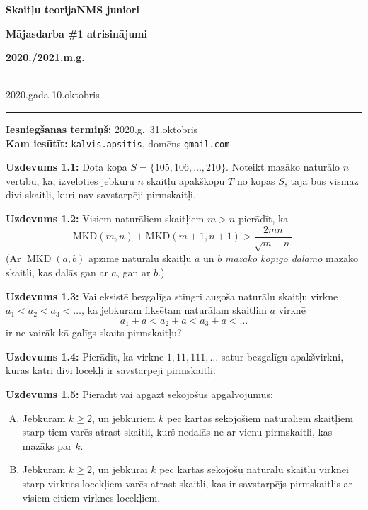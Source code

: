 \documentclass[a4paper,12pt]{article}
\begin{document}
\begin{center}
\parbox{3.5cm}{\flushleft\bf Skaitļu teorija\linebreak NMS juniori} \hfill {\bf \large Mājasdarba \#1 atrisinājumi} \hfill \parbox{3.5cm}{\flushright\bf 2020./2021.m.g.} \\[2pt]
\rm\small 2020.gada 10.oktobris
\end{center}

\hrule

\vspace{20pt}
{\bf Iesniegšanas termiņš:} 2020.g.\ 31.oktobris\\
{\bf Kam iesūtīt:} {\tt kalvis.apsitis}, domēns {\tt gmail.com}


\vspace{20pt}
{\bf Uzdevums 1.1:} 
Dota kopa $S = \{ 105,106,\ldots,210 \}$. Noteikt mazāko
naturālo $n$ vērtību, ka, izvēloties jebkuru $n$ skaitļu
apakškopu $T$ no kopas $S$, tajā būs vismaz divi skaitļi, kuri nav
savstarpēji pirmskaitļi.


\vspace{20pt}
{\bf Uzdevums 1.2:}
Visiem naturāliem skaitļiem $m > n$ pierādīt, ka
$$\mbox{MKD}(m,n) + \mbox{MKD}(m+1,n+1) > \frac{2mn}{\sqrt{m-n}}.$$
(Ar $\operatorname{MKD}(a,b)$ apzīmē naturālu skaitļu $a$ un $b$ {\em mazāko 
kopīgo dalāmo} \textendash{} mazāko skaitli, kas dalās gan ar $a$, gan ar $b$.)


\vspace{20pt}
{\bf Uzdevums 1.3:}
Vai eksistē bezgalīga
stingri augoša naturālu skaitļu virkne $a_1 < a_2 < a_3 <\ldots$,
ka jebkuram fiksētam naturālam skaitlim $a$ virknē 
$$a_1+a < a_2+a < a_3 + a < \ldots$$
ir ne vairāk kā galīgs skaits pirmskaitļu?

\vspace{20pt}
{\bf Uzdevums 1.4:}
Pierādīt, ka virkne $1,11,111,\ldots$ satur bezgalīgu apakšvirkni,
kuras katri divi locekļi ir savstarpēji pirmskaitļi.



\vspace{20pt}
{\bf Uzdevums 1.5:}
Pierādīt vai apgāzt sekojošus apgalvojumus:
\begin{enumerate}[(A)]
\item Jebkuram $k \geq 2$, un jebkuriem $k$ pēc kārtas sekojošiem naturāliem 
skaitļiem starp tiem varēs atrast skaitli, kurš nedalās ne ar vienu pirmskaitli, kas mazāks par $k$.   
\item Jebkuram $k \geq 2$, un jebkurai $k$ pēc kārtas sekojošu naturālu skaitļu virknei starp virknes locekļiem varēs atrast skaitli, 
kas ir savstarpējs pirmskaitlis ar visiem citiem virknes locekļiem. 
\end{enumerate}
\end{document}

